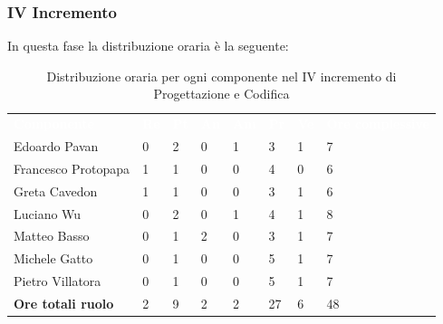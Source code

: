 \subsubsection{IV Incremento}
In questa fase la distribuzione oraria è la seguente:
\begin{table}[H]
\begin{center}
\renewcommand{\arraystretch}{1.25}
\begin{tabular}{ m{}<{\centering}  m{}<{\centering} m{}<{\centering} m{}<{\centering}  m{}<{\centering}  m{}<{\centering}  m{}<{\centering}  m{}<{\centering}   }
	\rowcolor{darkblue}
	\textcolor{white}{\textbf{Componente}} &\textcolor{white}{\textbf{Re}}&\textcolor{white}{\textbf{Pt}}&\textcolor{white}{\textbf{An}}&\textcolor{white}{\textbf{Am}}&\textcolor{white}{\textbf{Pr}}&\textcolor{white}{\textbf{Ve}}&\textcolor{white}{\textbf{Ore complessive}}\\ 
	Edoardo Pavan & 0 & 2 & 0 & 1 & 3 & 1 & 7 \\	
	
	Francesco Protopapa & 1 & 1 & 0 & 0 & 4 & 0 & 6 \\

	Greta Cavedon & 1 & 1 & 0 & 0 & 3 & 1 & 6 \\
	
	Luciano Wu & 0 & 2 & 0 & 1 & 4 & 1 & 8 \\
	
	Matteo Basso & 0 & 1 & 2 & 0 & 3 & 1 & 7 \\
	
	Michele Gatto & 0 & 1 & 0 & 0 & 5 & 1 & 7 \\
	
	Pietro Villatora & 0 & 1 & 0 & 0 & 5 & 1 & 7 \\
	
	\textbf{Ore totali ruolo} & 2 & 9 & 2 & 2 & 27 & 6 & 48 \\

\end{tabular}
\caption{Distribuzione oraria per ogni componente nel IV incremento di Progettazione e Codifica}
\end{center}
\end{table}

